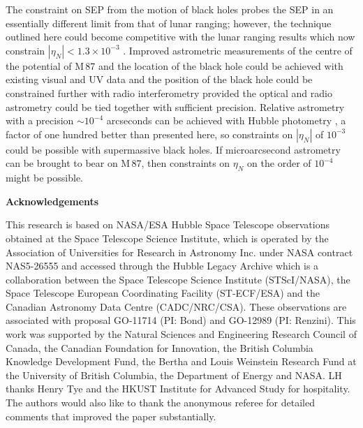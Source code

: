 \documentclass[useAMS,usenatbib]{mn2e}
\begin{document}
The constraint on SEP from the motion of black holes probes the SEP 
in an essentially different limit 
from that of
lunar ranging; however, the technique outlined here could become
competitive with the lunar ranging results which now constrain
$|\eta_N|<1.3 \times 10^{-3}$ \citep{Baess:1999,2001CQGra..18.2397A}.
Improved astrometric measurements of the centre of the potential of
M\,87 and the location of the black hole could be achieved with
existing visual and UV data and the position of the black hole could
be
constrained 
further with radio 
interferometry 
provided
the optical and radio astrometry could be tied together with
sufficient precision.  Relative astrometry with a precision $\sim
10^{-4}$ arcseconds can be achieved with Hubble photometry
\citep[e.g.][]{Heyl116397dyn}, a factor of one hundred better than
presented here, so constraints on $|\eta_N|$ of $10^{-3}$ could be
possible with supermassive black holes.  If microarcsecond astrometry
can be brought to bear \citep[e.g.][]{2011ApJ...735...57B} on M\,87,
then 
constraints
on $\eta_N$ on the order of $10^{-4}$ might be possible.

{\noindent \bf Acknowledgements}

This research is based on NASA/ESA Hubble Space Telescope observations
obtained at the Space Telescope Science Institute, which is operated
by the Association of Universities for Research in Astronomy
Inc. under NASA contract NAS5-26555 and accessed through the Hubble
Legacy Archive which is a collaboration between the Space Telescope
Science Institute (STScI/NASA), the Space Telescope European
Coordinating Facility (ST-ECF/ESA) and the Canadian Astronomy Data
Centre (CADC/NRC/CSA). These observations are associated with proposal
GO-11714 (PI: Bond) and GO-12989 (PI: Renzini).  This work was
supported by the Natural Sciences and Engineering Research Council of
Canada, the Canadian Foundation for Innovation, the British Columbia
Knowledge Development Fund, the Bertha and Louis Weinstein Research
Fund at the University of British Columbia, the Department of Energy
and NASA. LH thanks Henry Tye and the HKUST Institute for Advanced
Study for hospitality.  The authors would also like to thank the
anonymous referee for detailed comments that improved the paper
substantially.





\label{lastpage}
\end{document}
